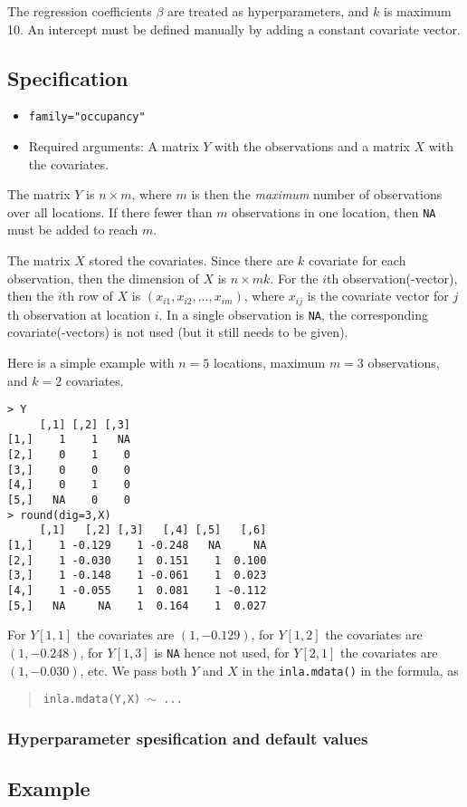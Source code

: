 \documentclass[a4paper,11pt]{article}
\begin{document}
The regression coefficients $\beta$ are treated as hyperparameters,
and $k$ is maximum 10. An intercept must be defined manually by adding
a constant covariate vector.

\subsection*{Specification}

\begin{itemize}
\item \texttt{family="occupancy"}
\item Required arguments: A matrix $Y$ with the observations and a matrix
    $X$ with the covariates.
\end{itemize}
The matrix $Y$ is $n\times m$, where $m$ is then the \emph{maximum}
number of observations over all locations. If there fewer than $m$
observations in one location, then \texttt{NA} must be added to reach
$m$.

The matrix $X$ stored the covariates. Since there are $k$ covariate
for each observation, then the dimension of $X$ is $n \times m k$. For
the $i$th observation(-vector), then the $i$th row of $X$ is
$(x_{i1}, x_{i2}, \ldots, x_{im})$, where $x_{ij}$ is the covariate
vector for $j$th observation at location $i$. In a single observation
is \texttt{NA}, the corresponding covariate(-vectors) is not used (but
it still needs to be given).

\clearpage
Here is a simple example with $n=5$ locations, maximum $m=3$
observations, and $k=2$ covariates.
\begin{verbatim}
> Y
     [,1] [,2] [,3]
[1,]    1    1   NA
[2,]    0    1    0
[3,]    0    0    0
[4,]    0    1    0
[5,]   NA    0    0
> round(dig=3,X)
     [,1]   [,2] [,3]   [,4] [,5]   [,6]
[1,]    1 -0.129    1 -0.248   NA     NA
[2,]    1 -0.030    1  0.151    1  0.100
[3,]    1 -0.148    1 -0.061    1  0.023
[4,]    1 -0.055    1  0.081    1 -0.112
[5,]   NA     NA    1  0.164    1  0.027
\end{verbatim}
For $Y[1,1]$ the covariates are $(1, -0.129)$, for $Y[1,2]$ the
covariates are $(1, -0.248)$, for $Y[1,3]$ is \texttt{NA} hence not
used, for $Y[2,1]$ the covariates are $(1, -0.030)$, etc. We pass both
$Y$ and $X$ in the \texttt{inla.mdata()} in the formula, as
\begin{quote}
    \texttt{inla.mdata(Y,X) $\sim$ ...}
\end{quote}

\subsubsection*{Hyperparameter spesification and default values}
{\small }

\clearpage
\subsection*{Example}
{\small }
\end{document}
